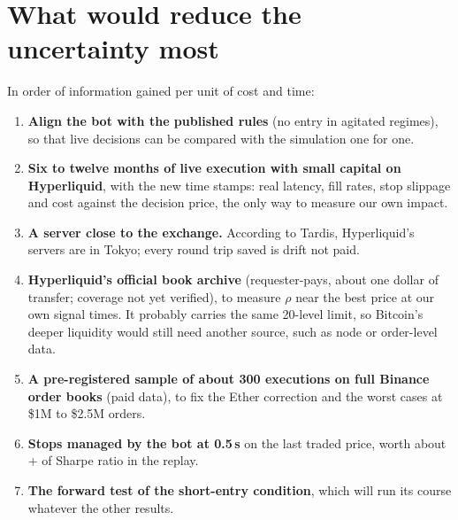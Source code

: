 \documentclass[11pt,a4paper]{article}
\begin{document}
\section{What would reduce the uncertainty most}\label{sec:roadmap}
In order of information gained per unit of cost and time:

\begin{enumerate}[label={\sffamily\bfseries\color{accent}\arabic*.},leftmargin=1.6em]
\item \textbf{Align the bot with the published rules} (no entry in agitated regimes), so that live decisions can be compared
  with the simulation one for one.
\item \textbf{Six to twelve months of live execution with small capital on Hyperliquid}, with the new time stamps: real latency,
  fill rates, stop slippage and cost against the decision price, the only way to measure our own impact.
\item \textbf{A server close to the exchange.} According to Tardis, Hyperliquid's servers are in Tokyo; every round trip saved is drift not paid.
\item \textbf{Hyperliquid's official book archive} (requester-pays, about one dollar of transfer; coverage not yet verified), to
  measure $\rho$ near the best price at our own signal times. It probably carries the same 20-level limit, so Bitcoin's deeper
  liquidity would still need another source, such as node or order-level data.
\item \textbf{A pre-registered sample of about 300 executions on full Binance order books} (paid data), to fix the Ether correction and
  the worst cases at \$1M to \$2.5M orders.
\item \textbf{Stops managed by the bot at 0.5\,s} on the last traded price, worth about +\BridgeStops{} of Sharpe ratio in the replay.
\item \textbf{The forward test of the short-entry condition}, which will run its course whatever the other results.
\end{enumerate}

\appendix
\end{document}
